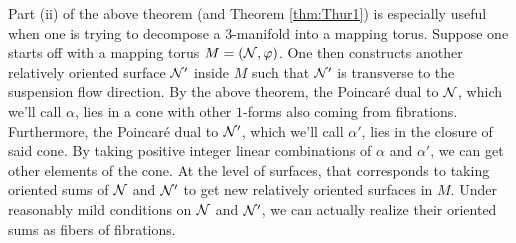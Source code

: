 Part (ii) of the above theorem (and Theorem \ref{thm:Thur1}) is especially useful when one is trying to
decompose a $3$-manifold into a mapping torus. Suppose one starts off with a mapping torus
$M = (\mathcal{N}, \varphi)$. One then constructs another relatively oriented surface $\mathcal{N}'$ inside $M$ such that
$\mathcal{N}'$ is transverse to the suspension flow direction. By the above theorem, the Poincar\'e dual to $\mathcal{N}$,
which we'll call $\alpha$, lies in a cone with other $1$-forms also coming from fibrations. Furthermore, the
Poincar\'e dual to $\mathcal{N}'$, which we'll call $\alpha'$, lies in the closure of said cone. By taking positive
integer linear combinations of $\alpha$ and $\alpha'$, we can get other elements of the cone. At the level of
surfaces, that corresponds to taking oriented sums of $\mathcal{N}$ and $\mathcal{N}'$ to get new relatively oriented surfaces
in $M$. Under reasonably mild conditions on $\mathcal{N}$ and $\mathcal{N}'$, we can actually realize their oriented sums as
fibers of fibrations.

